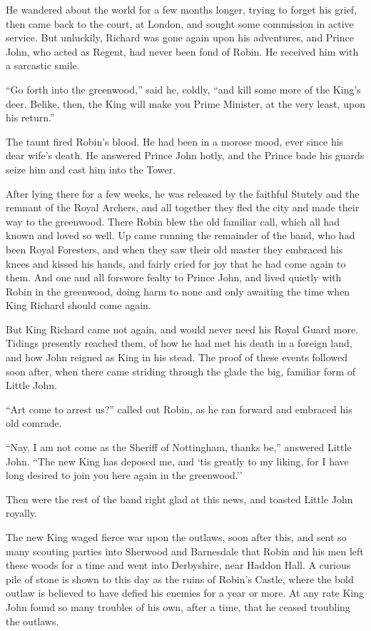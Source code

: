 He wandered about the world for a few months longer, trying to forget
his grief, then came back to the court, at London, and sought some
commission in active service. But unluckily, Richard was gone again upon
his adventures, and Prince John, who acted as Regent, had never been
fond of Robin. He received him with a sarcastic smile.

``Go forth into the greenwood,'' said he, coldly, ``and kill some more
of the King's deer. Belike, then, the King will make you Prime Minister,
at the very least, upon his return.''

The taunt fired Robin's blood. He had been in a morose mood, ever since
his dear wife's death. He answered Prince John hotly, and the Prince
bade his guards seize him and cast him into the Tower.

After lying there for a few weeks, he was released by the faithful
Stutely and the remnant of the Royal Archers, and all together they fled
the city and made their way to the greenwood. There Robin blew the old
familiar call, which all had known and loved so well. Up came running
the remainder of the band, who had been Royal Foresters, and when they
saw their old master they embraced his knees and kissed his hands, and
fairly cried for joy that he had come again to them. And one and all
forswore fealty to Prince John, and lived quietly with Robin in the
greenwood, doing harm to none and only awaiting the time when King
Richard should come again.

But King Richard came not again, and would never need his Royal Guard
more. Tidings presently reached them, of how he had met his death in a
foreign land, and how John reigned as King in his stead. The proof of
these events followed soon after, when there came striding through the
glade the big, familiar form of Little John.

``Art come to arrest us?'' called out Robin, as he ran forward and
embraced his old comrade.

``Nay, I am not come as the Sheriff of Nottingham, thanks be,'' answered
Little John. ``The new King has deposed me, and `tis greatly to my
liking, for I have long desired to join you here again in the
greenwood.''

Then were the rest of the band right glad at this news, and toasted
Little John royally.

The new King waged fierce war upon the outlaws, soon after this, and
sent so many scouting parties into Sherwood and Barnesdale that Robin
and his men left these woods for a time and went into Derbyshire, near
Haddon Hall. A curious pile of stone is shown to this day as the ruins
of Robin's Castle, where the bold outlaw is believed to have defied his
enemies for a year or more. At any rate King John found so many troubles
of his own, after a time, that he ceased troubling the outlaws.

